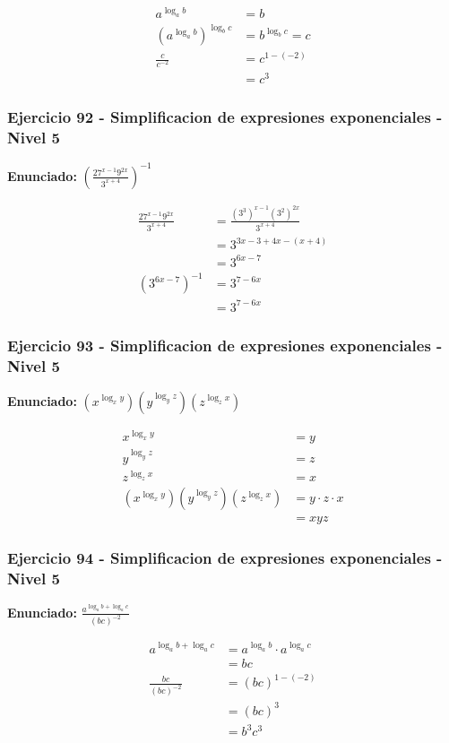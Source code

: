 \documentclass[12pt,a4paper]{article}
\begin{document}
\[
\begin{aligned}
a^{\log_a b}&=b\\
(a^{\log_a b})^{\log_b c}&=b^{\log_b c}=c\\
\frac{c}{c^{-2}}&=c^{1-(-2)}\\
&=\boxed{c^3}
\end{aligned}
\]


\subsubsection*{Ejercicio 92 - Simplificacion de expresiones exponenciales - Nivel 5}
\textbf{Enunciado:} \(\left(\frac{27^{x-1}9^{2x}}{3^{x+4}}\right)^{-1}\)

\[
\begin{aligned}
\frac{27^{x-1}9^{2x}}{3^{x+4}}&=\frac{(3^3)^{x-1}(3^2)^{2x}}{3^{x+4}}\\
&=3^{3x-3+4x-(x+4)}\\
&=3^{6x-7}\\
\left(3^{6x-7}\right)^{-1}&=3^{7-6x}\\
&=\boxed{3^{7-6x}}
\end{aligned}
\]


\subsubsection*{Ejercicio 93 - Simplificacion de expresiones exponenciales - Nivel 5}
\textbf{Enunciado:} \((x^{\log_x y})(y^{\log_y z})(z^{\log_z x})\)

\[
\begin{aligned}
x^{\log_x y}&=y\\
y^{\log_y z}&=z\\
z^{\log_z x}&=x\\
(x^{\log_x y})(y^{\log_y z})(z^{\log_z x})&=y\cdot z\cdot x\\
&=\boxed{xyz}
\end{aligned}
\]


\subsubsection*{Ejercicio 94 - Simplificacion de expresiones exponenciales - Nivel 5}
\textbf{Enunciado:} \(\frac{a^{\log_a b+\log_a c}}{(bc)^{-2}}\)

\[
\begin{aligned}
a^{\log_a b+\log_a c}&=a^{\log_a b}\cdot a^{\log_a c}\\
&=bc\\
\frac{bc}{(bc)^{-2}}&=(bc)^{1-(-2)}\\
&=(bc)^3\\
&=\boxed{b^3c^3}
\end{aligned}
\]
\end{document}
